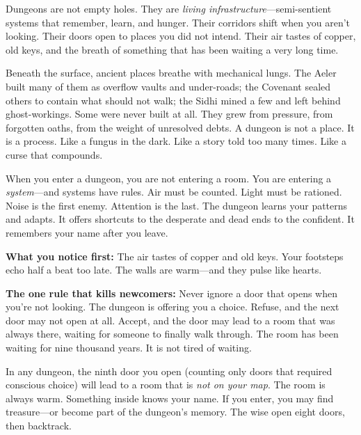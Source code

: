 \vspace{2mm}
\begin{tcolorbox}[colback=black!3,colframe=blue!60!black,title={Theme \& Atmosphere},breakable]
Dungeons are not empty holes. They are \emph{living infrastructure}---semi-sentient systems that remember, learn, and hunger. Their corridors shift when you aren't looking. Their doors open to places you did not intend. Their air tastes of copper, old keys, and the breath of something that has been waiting a very long time.

Beneath the surface, ancient places breathe with mechanical lungs. The Aeler built many of them as overflow vaults and under-roads; the Covenant sealed others to contain what should not walk; the Sidhi mined a few and left behind ghost-workings. Some were never built at all. They grew from pressure, from forgotten oaths, from the weight of unresolved debts. A dungeon is not a place. It is a process. Like a fungus in the dark. Like a story told too many times. Like a curse that compounds.

When you enter a dungeon, you are not entering a room. You are entering a \emph{system}---and systems have rules. Air must be counted. Light must be rationed. Noise is the first enemy. Attention is the last. The dungeon learns your patterns and adapts. It offers shortcuts to the desperate and dead ends to the confident. It remembers your name after you leave.

\vspace{2mm}
\textbf{What you notice first:} The air tastes of copper and old keys. Your footsteps echo half a beat too late. The walls are warm---and they pulse like hearts.

\textbf{The one rule that kills newcomers:} Never ignore a door that opens when you're not looking. The dungeon is offering you a choice. Refuse, and the next door may not open at all. Accept, and the door may lead to a room that was always there, waiting for someone to finally walk through. The room has been waiting for nine thousand years. It is not tired of waiting.
\end{tcolorbox}

\begin{tcolorbox}[colback=black!3,colframe=red!60!black,title={The Ninth Taboo Manifestation},breakable]
In any dungeon, the ninth door you open (counting only doors that required conscious choice) will lead to a room that is \emph{not on your map}. The room is always warm. Something inside knows your name. If you enter, you may find treasure---or become part of the dungeon's memory. The wise open eight doors, then backtrack.
\end{tcolorbox}

